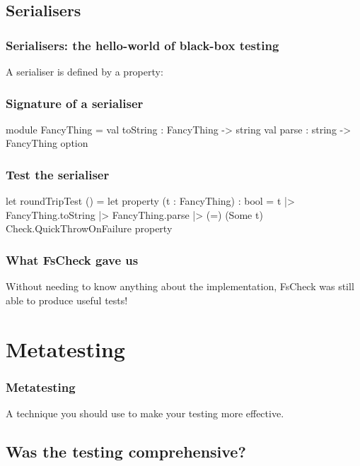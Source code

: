 \documentclass{beamer}
\begin{document}
\subsection{Serialisers}
\begin{frame}
\frametitle{Serialisers: the hello-world of black-box testing}

A serialiser is defined by a property:

\hfill \break

\noindent{}

\end{frame}

\begin{frame}[fragile]
\frametitle{Signature of a serialiser}

\begin{fslisting}
[<RequireQualifiedAccess>]
module FancyThing =
    val toString : FancyThing -> string
    val parse : string -> FancyThing option
\end{fslisting}
\end{frame}

\begin{frame}[fragile]
\frametitle{Test the serialiser}

\begin{fslisting}
[<Test>]
let roundTripTest () =
    let property (t : FancyThing) : bool =
        t
        |> FancyThing.toString
        |> FancyThing.parse
        |> (=) (Some t)
    Check.QuickThrowOnFailure property
\end{fslisting}
\end{frame}

\begin{frame}
\frametitle{What FsCheck gave us}
Without needing to know anything about the implementation, FsCheck was still able to produce useful tests!
\end{frame}

\section{Metatesting}
\tableofcontents[currentsection]

\begin{frame}
\frametitle{Metatesting}
A technique you should use to make your testing more effective.
\end{frame}

\subsection{Was the testing comprehensive?}
\end{document}
